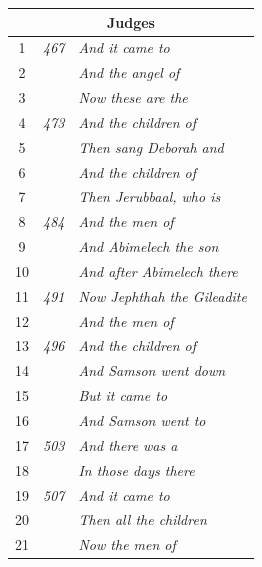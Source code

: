 \documentclass{article}
\newlength{\minipageheight}
\newlength{\minipagewidth}
\begin{document}
\begin{minipage}[r][\minipageheight][t]{\minipagewidth}
\begin{longtable}{ccl}
        \multicolumn{3}{c}{\textbf{Judges}}                              \\
        \hline
        1           & \textit{467} & \textit{And it came to}             \\
        2           &              & \textit{And the angel of}           \\
        3           &              & \textit{Now these are the}          \\
        4           & \textit{473} & \textit{And the children of}        \\
        5           &              & \textit{Then sang Deborah and}      \\
        6           &              & \textit{And the children of}        \\
        7           &              & \textit{Then Jerubbaal, who is}     \\
        8           & \textit{484} & \textit{And the men of}             \\
        9           &              & \textit{And Abimelech the son}      \\
        10          &              & \textit{And after Abimelech there}  \\
        11          & \textit{491} & \textit{Now Jephthah the Gileadite} \\
        12          &              & \textit{And the men of}             \\
        13          & \textit{496} & \textit{And the children of}        \\
        14          &              & \textit{And Samson went down}       \\
        15          &              & \textit{But it came to}             \\
        16          &              & \textit{And Samson went to}         \\
        17          & \textit{503} & \textit{And there was a}            \\
        18          &              & \textit{In those days there}        \\
        19          & \textit{507} & \textit{And it came to}             \\
        20          &              & \textit{Then all the children}      \\
        21          &              & \textit{Now the men of}             \\


\end{longtable}
\end{minipage}
\end{document}
